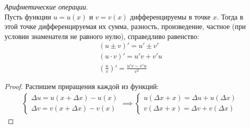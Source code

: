 \begin{theorem}
  \textit{Арифметические операции}. \\
  Пусть функции $u = u(x)$ и $v = v(x)$ дифференцируемы в точке $x$. Тогда в этой точке дифференцируемая их сумма, разность, произведение, частное (при условии знаменателя не равного нулю), справедливо равенство:
  \begin{gather*}
    (u \pm v)' = u' \pm v' \\
    (u \cdot v)' = u'v + v'u \\
    \left( \frac{u}{v} \right)' = \frac{u'v - v'u}{v^2} 
  \end{gather*}
\end{theorem}
\begin{proof}
  Распишем приращения каждой из функций:
  \begin{gather*}
    \begin{cases}
      \Delta u = u(x + \Delta x) - u(x) \\
      \Delta v = v(x + \Delta x) - v(x)
    \end{cases} \implies
    \begin{cases}
      u(\Delta x + x) = \Delta u + u(\Delta x) \\
      v(\Delta x + x) = \Delta v + v(\Delta x)
    \end{cases}
  \end{gather*}
\end{proof}

